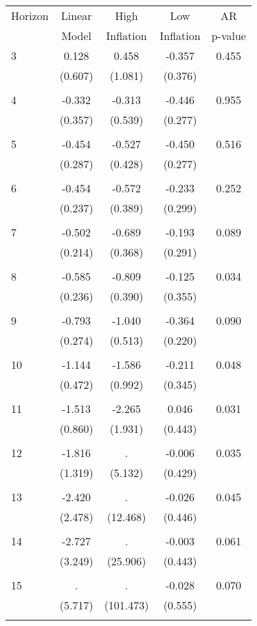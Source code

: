 \begin{tabular}{l*{1}{cccc}}
\hline\hline
 Horizon  & Linear & High                 & Low           & AR            \\
                  & Model         & Inflation & Inflation & p-value       \\
\hline
   3       & 0.128 & 0.458 & -0.357 & 0.455 \\
          & (0.607) & (1.081) & (0.376) & \\
 & & & &\\
   4       & -0.332 & -0.313 & -0.446 & 0.955 \\
          & (0.357) & (0.539) & (0.277) & \\
 & & & &\\
   5       & -0.454 & -0.527 & -0.450 & 0.516 \\
          & (0.287) & (0.428) & (0.277) & \\
 & & & &\\
   6       & -0.454 & -0.572 & -0.233 & 0.252 \\
          & (0.237) & (0.389) & (0.299) & \\
 & & & &\\
   7       & -0.502 & -0.689 & -0.193 & 0.089 \\
          & (0.214) & (0.368) & (0.291) & \\
 & & & &\\
   8       & -0.585 & -0.809 & -0.125 & 0.034 \\
          & (0.236) & (0.390) & (0.355) & \\
 & & & &\\
   9       & -0.793 & -1.040 & -0.364 & 0.090 \\
          & (0.274) & (0.513) & (0.220) & \\
 & & & &\\
  10       & -1.144 & -1.586 & -0.211 & 0.048 \\
          & (0.472) & (0.992) & (0.345) & \\
 & & & &\\
  11       & -1.513 & -2.265 & 0.046 & 0.031 \\
          & (0.860) & (1.931) & (0.443) & \\
 & & & &\\
  12       & -1.816 &     . & -0.006 & 0.035 \\
          & (1.319) & (5.132) & (0.429) & \\
 & & & &\\
  13       & -2.420 &     . & -0.026 & 0.045 \\
          & (2.478) & (12.468) & (0.446) & \\
 & & & &\\
  14       & -2.727 &     . & -0.003 & 0.061 \\
          & (3.249) & (25.906) & (0.443) & \\
 & & & &\\
  15       &     . &     . & -0.028 & 0.070 \\
          & (5.717) & (101.473) & (0.555) & \\
 & & & &\\
\hline\hline
\end{tabular}
